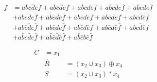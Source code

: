 \begin{align}
f &=  \bar{a}\bar{b}\bar{c}\bar{d}\bar{e}f+\bar{a}\bar{b}\bar{c}\bar{d}ef+
\bar{a}\bar{b}\bar{c}d\bar{e}\bar{f}+\bar{a}\bar{b}c\bar{d}e\bar{f}+\bar{a}\bar{b}cde\bar{f}\nonumber \\&
+\bar{a}bcde\bar{f}+\bar{a}b\bar{c}\bar{d}\bar{e}\bar{f}+\bar{a}b\bar{c}de\bar{f}+\bar{a}b\bar{c}def+ab\bar{c}\bar{d}\bar{e}\bar{f}\nonumber \\&
+ab\bar{c}\bar{d}e\bar{f}+ab\bar{c}de\bar{f}+ab\bar{c}d\bar{e}f+ab\bar{c}d\bar{e}\bar{f} +abc\bar{d}\bar{e}f\nonumber \\&
+a\bar{b}c\bar{d}e\bar{f}+a\bar{b}\bar{c}\bar{d}\bar{e}\bar{f}+a\bar{b}\bar{c}b\bar{e}\bar{f}
\label{eq:1}
\end{align}

\begin{align}

C &= {x}_{1}\nonumber \\&
\bar{R} &= ({x}_{2}\cup{x}_{3})\oplus{x}_{4}\nonumber \\&
S &= ({x}_{2}\cup{x}_{3})*\bar{x}_{4}
\end{align}